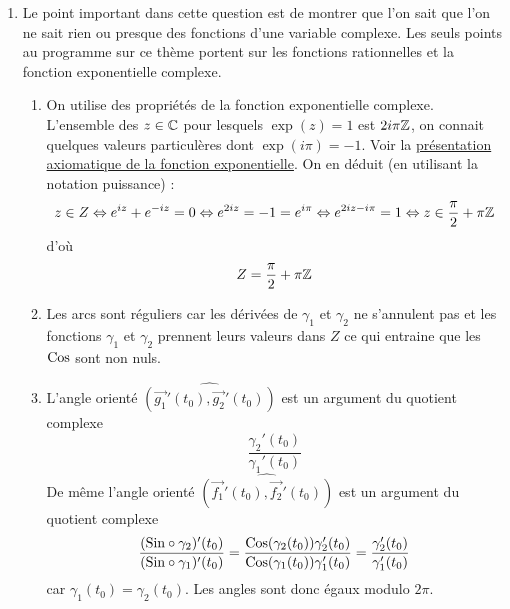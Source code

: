 \def\Cos{\textnormal{Cos}}
\def\Sin{\textnormal{Sin}}

\begin{enumerate}
  \item Le point important dans cette question est de montrer que l'on sait que l'on ne sait rien ou presque des fonctions d'une variable complexe.\newline
Les seuls points au programme sur ce thème portent sur les fonctions rationnelles et la fonction exponentielle complexe.
\begin{enumerate}
 \item On utilise des propriétés de la fonction exponentielle complexe. L'ensemble des $z\in \mathbb{C}$ pour lesquels $\exp(z)=1$ est $2i\pi \mathbb{Z}$, on connait quelques valeurs particulères dont $\exp(i\pi)=-1$. Voir la \href{http:/back.maquisdoc.net/data/coursnicolair/C2002.pdf}{présentation axiomatique de la fonction exponentielle}. On en déduit (en utilisant la notation puissance) :
\begin{displaymath}
 z\in Z \Leftrightarrow e^{iz}+e^{-iz}=0\Leftrightarrow e^{2iz}=-1=e^{i\pi}
\Leftrightarrow e^{2iz-i\pi}=1
\Leftrightarrow z\in \frac{\pi}{2} + \pi\mathbb{Z}
\end{displaymath}
d'où 
\begin{displaymath}
 Z = \frac{\pi}{2} + \pi\mathbb{Z}
\end{displaymath}

 \item Les arcs sont réguliers car les dérivées de $\gamma_1$ et $\gamma_2$ ne s'annulent pas et les fonctions $\gamma_1$ et $\gamma_2$ prennent leurs valeurs dans $Z$ ce qui entraine que les $\Cos$ sont non nuls.
 \item L'angle orienté $\widehat{(\overrightarrow{g_{1}}'(t_0),\overrightarrow{g_{2}}'(t_0))}$ est un argument du quotient complexe
\begin{displaymath}
 \frac{\gamma_2'(t_0)}{\gamma_1'(t_0)}
\end{displaymath}
De même l'angle orienté $\widehat{(\overrightarrow{f_{1}}'(t_0),\overrightarrow{f_{2}}'(t_0))}$ est un argument du quotient complexe
\begin{displaymath}
  \frac{(\Sin \circ\gamma_2)'(t_0)}{(\Sin \circ\gamma_1)'(t_0)}
=
\frac{\Cos(\gamma_2(t_0))\gamma_2'(t_0)}{\Cos(\gamma_1(t_0))\gamma_1'(t_0)}
= \frac{\gamma_2'(t_0)}{\gamma_1'(t_0)}
\end{displaymath}
car $\gamma_1(t_0)=\gamma_2(t_0)$. Les angles sont donc égaux modulo $2\pi$.
\end{enumerate}
 

\end{enumerate}
